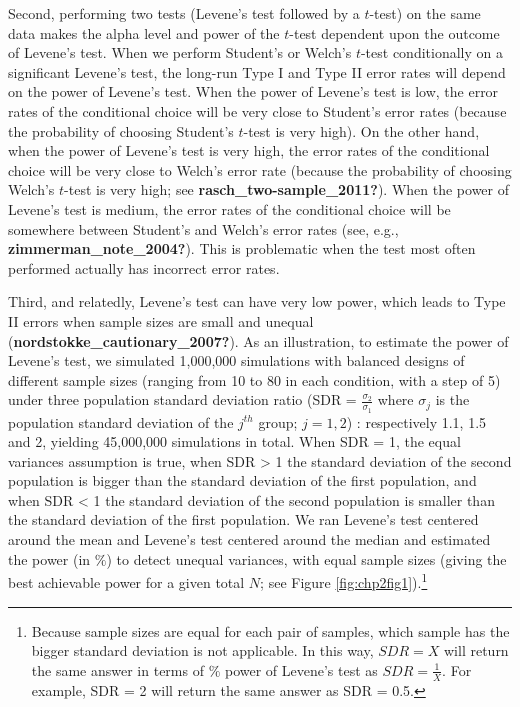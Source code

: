 \documentclass[
  english,
  man]{apa6}
\begin{document}
Second, performing two tests (Levene's test followed by a \(t\)-test) on the same data makes the alpha level and power of the \(t\)-test dependent upon the outcome of Levene's test. When we perform Student's or Welch's \(t\)-test conditionally on a significant Levene's test, the long-run Type I and Type II error rates will depend on the power of Levene's test. When the power of Levene's test is low, the error rates of the conditional choice will be very close to Student's error rates (because the probability of choosing Student's \(t\)-test is very high). On the other hand, when the power of Levene's test is very high, the error rates of the conditional choice will be very close to Welch's error rate (because the probability of choosing Welch's \(t\)-test is very high; see \textbf{rasch\_two-sample\_2011?}). When the power of Levene's test is medium, the error rates of the conditional choice will be somewhere between Student's and Welch's error rates (see, e.g., \textbf{zimmerman\_note\_2004?}). This is problematic when the test most often performed actually has incorrect error rates.

Third, and relatedly, Levene's test can have very low power, which leads to Type II errors when sample sizes are small and unequal (\textbf{nordstokke\_cautionary\_2007?}). As an illustration, to estimate the power of Levene's test, we simulated 1,000,000 simulations with balanced designs of different sample sizes (ranging from 10 to 80 in each condition, with a step of 5) under three population standard deviation ratio (SDR = \(\frac{\sigma_2}{\sigma_1}\) where \(\sigma_j\) is the population standard deviation of the \(j^{th}\) group; \(j=1,2\)) : respectively 1.1, 1.5 and 2, yielding 45,000,000 simulations in total. When SDR = 1, the equal variances assumption is true, when SDR \textgreater{} 1 the standard deviation of the second population is bigger than the standard deviation of the first population, and when SDR \textless{} 1 the standard deviation of the second population is smaller than the standard deviation of the first population. We ran Levene's test centered around the mean and Levene's test centered around the median and estimated the power (in \(\%\)) to detect unequal variances, with equal sample sizes (giving the best achievable power for a given total \(N\); see Figure \ref{fig:chp2fig1}).\footnote{Because sample sizes are equal for each pair of samples, which sample has the bigger standard deviation is not applicable. In this way, $SDR = X$ will return the same answer in terms of $\%$ power of Levene’s test as $SDR = \frac{1}{X}$. For example, SDR = 2 will return the same answer as SDR = 0.5.}
\end{document}
